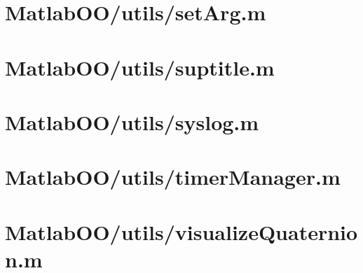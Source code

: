 \pagebreak
\section{MatlabOO/utils/setArg.m}\label{code:MatlabOO/utils/setArg.m}


\pagebreak
\section{MatlabOO/utils/suptitle.m}\label{code:MatlabOO/utils/suptitle.m}


\pagebreak
\section{MatlabOO/utils/syslog.m}\label{code:MatlabOO/utils/syslog.m}


\pagebreak
\section{MatlabOO/utils/timerManager.m}\label{code:MatlabOO/utils/timerManager.m}


\pagebreak
\section{MatlabOO/utils/visualizeQuaternion.m}\label{code:MatlabOO/utils/visualizeQuaternion.m}


